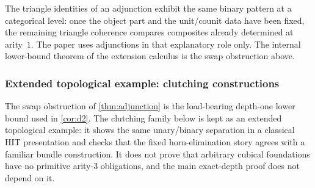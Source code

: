 \documentclass{lmcs}
\begin{document}
\begin{rem}
\label{rem:adjunction-reading}
The triangle identities of an adjunction exhibit the same binary pattern at a categorical level: once the object part and the unit/counit data have been fixed, the remaining triangle coherence compares composites already determined at arity~$1$. The paper uses adjunctions in that explanatory role only. The internal lower-bound theorem of the extension calculus is the swap obstruction above.
\end{rem}

\subsubsection{Extended topological example: clutching constructions}

The swap obstruction of \autoref{thm:adjunction} is the load-bearing
depth-one lower bound used in \autoref{cor:d2}. The clutching family below is
kept as an extended topological example: it shows the same unary/binary
separation in a classical HIT presentation and checks that the fixed
horn-elimination story agrees with a familiar bundle construction. It does not
prove that arbitrary cubical foundations have no primitive arity-$3$
obligations, and the main exact-depth proof does not depend on it.
\end{document}
